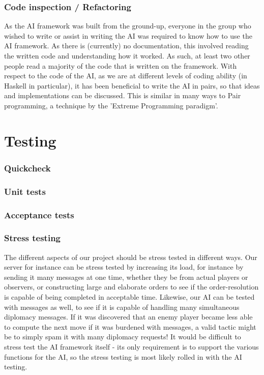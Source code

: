 \documentclass[11pt]{article}
\begin{document}
\subsubsection{Code inspection / Refactoring}
As the AI framework was built from the ground-up, everyone in the group who
wished to write or assist in writing the AI was required to know how to use the
AI framework. As there is (currently) no documentation, this involved reading
the written code and understanding how it worked. As such, at least two other 
people read a majority of the code that is written on the framework. With 
respect to the code of the AI, as we are at different levels of coding ability 
(in Haskell in particular), it has been beneficial to write the AI in pairs, so
that ideas and implementations can be discussed. This is similar in many ways to
Pair programming, a technique by the 'Extreme Programming paradigm'.

\section{Testing}

\subsubsection{Quickcheck}

\subsubsection{Unit tests}

\subsubsection{Acceptance tests}


\subsubsection{Stress testing}
The different aspects of our project should be stress tested in different ways.
Our server for instance can be stress tested by increasing its load, for 
instance by sending it many messages at one time, whether they be from actual
players or observers, or constructing large and elaborate orders to see if the
order-resolution is capable of being completed in acceptable time. Likewise, our
AI can be tested with messages as well, to see if it is capable of handling many
simultaneous diplomacy messages. If it was discovered that an enemy player 
became less able to compute the next move if it was burdened with messages, a 
valid tactic might be to simply spam it with many diplomacy requests! It would
be difficult to stress test the AI framework itself - its only requirement is to
support the various functions for the AI, so the stress testing is most likely
rolled in with the AI testing. 
\end{document}
